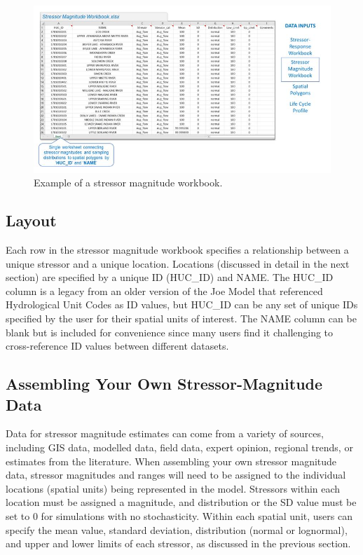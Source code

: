 \documentclass[
  letterpaper,
  DIV=11,
  numbers=noendperiod]{scrreprt}
\begin{document}
\begin{figure}

{\centering \includegraphics{images/image021.jpg}

}

\caption{\label{fig-stressor-magnitude}Example of a stressor magnitude
workbook.}

\end{figure}

\hypertarget{layout-1}{%
\subsection{Layout}\label{layout-1}}

Each row in the stressor magnitude workbook specifies a relationship
between a unique stressor and a unique location. Locations (discussed in
detail in the next section) are specified by a unique ID (HUC\_ID) and
NAME. The HUC\_ID column is a legacy from an older version of the Joe
Model that referenced Hydrological Unit Codes as ID values, but HUC\_ID
can be any set of unique IDs specified by the user for their spatial
units of interest. The NAME column can be blank but is included for
convenience since many users find it challenging to cross-reference ID
values between different datasets.

\hypertarget{assembling-your-own-stressor-magnitude-data}{%
\subsection{Assembling Your Own Stressor-Magnitude
Data}\label{assembling-your-own-stressor-magnitude-data}}

Data for stressor magnitude estimates can come from a variety of
sources, including GIS data, modelled data, field data, expert opinion,
regional trends, or estimates from the literature. When assembling your
own stressor magnitude data, stressor magnitudes and ranges will need to
be assigned to the individual locations (spatial units) being
represented in the model. Stressors within each location must be
assigned a magnitude, and distribution or the SD value must be set to 0
for simulations with no stochasticity. Within each spatial unit, users
can specify the mean value, standard deviation, distribution (normal or
lognormal), and upper and lower limits of each stressor, as discussed in
the previous section.
\end{document}

